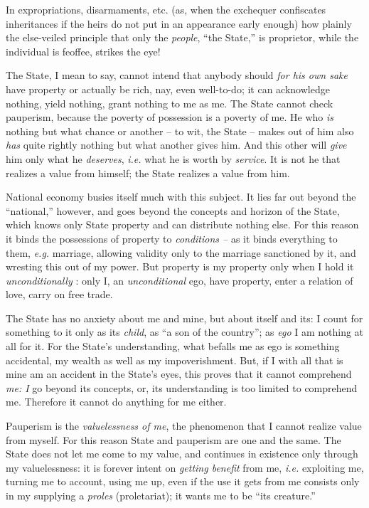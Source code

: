 In expropriations, disarmaments, etc. (as, when the exchequer confiscates 
inheritances if the heirs do not put in an appearance early enough) how 
plainly the else-veiled principle that only the \textit{people}, ``the 
State,'' is proprietor, while the individual is feoffee, strikes the eye!

The State, I mean to say, cannot intend that anybody should \textit{for his 
own sake} have property or actually be rich, nay, even well-to-do; it can 
acknowledge nothing, yield nothing, grant nothing to me as me. The State 
cannot check pauperism, because the poverty of possession is a poverty of me. 
He who \textit{is} nothing but what chance or another -- to wit, the State -- 
makes out of him also \textit{has} quite rightly nothing but what another 
gives him. And this other will \textit{give} him only what he 
\textit{deserves}, \textit{i.e.} what he is worth by \textit{service}. It is 
not he that realizes a value from himself; the State realizes a value from 
him.

National economy busies itself much with this subject. It lies far out beyond 
the ``national,'' however, and goes beyond the concepts and horizon of the 
State, which knows only State property and can distribute nothing else. For 
this reason it binds the possessions of property to \textit{conditions --} as 
it binds everything to them, \textit{e.g.} marriage, allowing validity only 
to the marriage sanctioned by it, and wresting this out of my power. But 
property is my property only when I hold it \textit{unconditionally} : only I, 
an \textit{unconditional} ego, have property, enter a relation of love, carry 
on free trade.

The State has no anxiety about me and mine, but about itself and its: I count 
for something to it only as its \textit{child}, as ``a son of the country''; 
as \textit{ego} I am nothing at all for it. For the State's understanding, 
what befalls me as ego is something accidental, my wealth as well as my 
impoverishment. But, if I with all that is mine am an accident in the State's 
eyes, this proves that it cannot comprehend \textit{me: I} go beyond its 
concepts, or, its understanding is too limited to comprehend me. Therefore it 
cannot do anything for me either.

Pauperism is the \textit{valuelessness of me}, the phenomenon that I cannot 
realize value from myself. For this reason State and pauperism are one and the 
same. The State does not let me come to my value, and continues in existence 
only through my valuelessness: it is forever intent on \textit{getting 
benefit} from me, \textit{i.e.} exploiting me, turning me to account, using me 
up, even if the use it gets from me consists only in my supplying a 
\textit{proles} (proletariat); it wants me to be ``its creature.''

